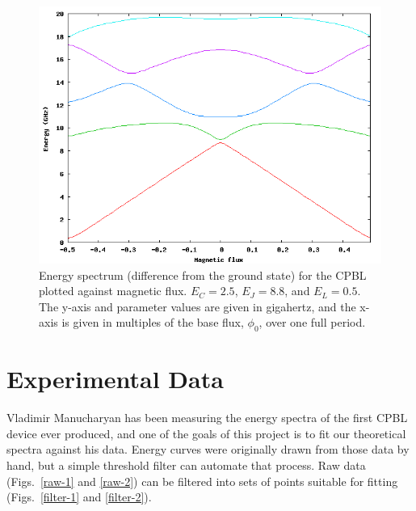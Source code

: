 \documentclass[twocolumn]{revtex4}
\begin{document}
\begin{figure} 
\includegraphics[width=\linewidth]{CPBL-theory.png}
\caption{ Energy spectrum (difference from the ground state) for the
  CPBL plotted against magnetic flux. $E_C=2.5$, $E_J=8.8$, and
  $E_L=0.5$. The y-axis and parameter values are given in gigahertz,
  and the x-axis is given in multiples of the base flux, $\phi_0$,
  over one full period.}
\label{cpbl-theory}
\end{figure}

\section{Experimental Data}
Vladimir Manucharyan has been measuring the energy spectra of the
first CPBL device ever produced, and one of the goals of this project
is to fit our theoretical spectra against his data. Energy curves were
originally drawn from those data by hand, but a simple threshold
filter can automate that process. Raw data (Figs.~\ref{raw-1} and
\ref{raw-2}) can be filtered into sets of points suitable for fitting
(Figs.~\ref{filter-1} and \ref{filter-2}).
\end{document}
